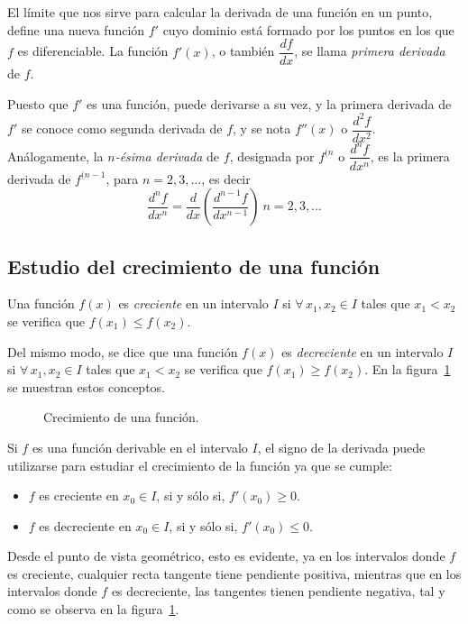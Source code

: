 El límite que nos sirve para calcular la derivada de una función en
un punto, define una nueva función $f'$ cuyo dominio está formado
por los puntos en los que $f$ es diferenciable. La función $f'(x)$,
o también $\dfrac{df}{dx}$, se llama \emph{primera derivada} de $f$.

Puesto que $f'$ es una función, puede derivarse a su vez, y la
primera derivada de $f'$ se conoce como segunda derivada de $f$, y
se nota $f''(x)$ o $\dfrac{d^2f}{dx^2}$. Análogamente, la
\emph{$n$-ésima derivada} de $f$, designada por $f^{(n}$ o
$\dfrac{d^nf}{dx^n}$, es la primera derivada de $f^{(n-1}$, para
$n=2,3,\ldots$, es decir
\[
\frac{d^nf}{dx^n}=\frac{d}{dx}\left(\frac{d^{n-1}f}{dx^{n-1}}\right)\
n=2,3,\ldots
\]


\subsection{Estudio del crecimiento de una función}
Una función $f(x)$ es \emph{creciente} en un intervalo $I$ si
$\forall\, x_1, x_2 \in I$ tales que $x_1<x_2$ se verifica que
$f(x_1)\leq f(x_2)$.

Del mismo modo, se dice que una función $f(x)$ es \emph{decreciente}
en un intervalo $I$ si $\forall\, x_1, x_2 \in I$ tales que
$x_1<x_2$ se verifica que $f(x_1)\geq f(x_2)$. En la
figura~\ref{g:crecimiento_derivada} se muestran estos conceptos.

\begin{figure}[h!]
\centering \subfigure[Función creciente.] {\label{g:funcion_creciente}
\scalebox{1}{}}\qquad
{}
\caption{Crecimiento de una función.}
\label{g:crecimiento_derivada}
\end{figure}

Si $f$ es una función derivable en el intervalo $I$, el signo de la
derivada puede utilizarse para estudiar el crecimiento de la función
ya que se cumple:
\begin{itemize}
\item $f$ es creciente en $x_0\in I$, si y sólo si, $f'(x_0)\geq 0$.
\item $f$ es decreciente en $x_0\in I$, si y sólo si, $f'(x_0)\leq 0$.
\end{itemize}

Desde el punto de vista geométrico, esto es evidente, ya en los
intervalos donde $f$ es creciente, cualquier recta tangente tiene
pendiente positiva, mientras que en los intervalos donde $f$ es
decreciente, las tangentes tienen pendiente negativa, tal y como se
observa en la figura~\ref{g:crecimiento_derivada}.

